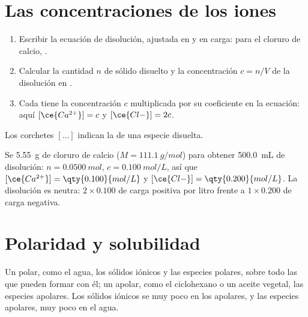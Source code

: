 \section{Las concentraciones de los iones}

\begin{method}\label{met:g11:dissolution:ions}
\begin{enumerate}
  \item Escribir la ecuación de disolución, ajustada en  y en
        carga: para el cloruro de calcio,
        .
  \item Calcular la cantidad $n$ de sólido disuelto y la concentración
        $c = n / V$ de la disolución en .
  \item Cada  tiene la concentración $c$ multiplicada por su
        coeficiente en la ecuación: aquí $[\ce{Ca^{2+}}] = c$ y
        $[\ce{Cl-}] = 2c$.
\end{enumerate}
Los corchetes $[\ldots]$ indican la  de una especie
disuelta.
\end{method}

\begin{example}\label{ex:g11:dissolution:cacl2}
Se  \qty{5.55}{g} de cloruro de calcio
($M = \qty{111.1}{g/mol}$) para obtener \qty{500.0}{mL} de disolución:
$n = \qty{0.0500}{mol}$, $c = \qty{0.100}{mol/L}$, así que
$[\ce{Ca^{2+}}] = \qty{0.100}{mol/L}$ y
$[\ce{Cl-}] = \qty{0.200}{mol/L}$. La disolución es neutra: $2 \times
0.100$ de carga positiva por litro frente a $1 \times 0.200$ de carga
negativa.
\end{example}

\section{Polaridad y solubilidad}

\begin{proposition}\label{prop:g11:dissolution:like}
Un  polar, como el agua,  los sólidos iónicos y las
especies polares, sobre todo las que pueden formar 
con él; un  apolar, como el ciclohexano o un aceite vegetal,
 las especies apolares. Los sólidos iónicos se  muy poco
en los  apolares, y las especies apolares, muy poco en el
agua.
\end{proposition}

